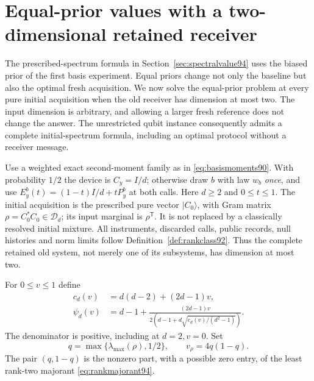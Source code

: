 \section{Equal-prior values with a two-dimensional retained receiver}
\label{sec:equalinitial95}
The prescribed-spectrum formula in Section~\ref{sec:spectralvalue94}
uses the biased prior of the first basis experiment.  Equal priors change
not only the baseline but also the optimal fresh acquisition.  We now
solve the equal-prior problem at every pure initial acquisition when the
old receiver has dimension at most two.  The input dimension is arbitrary,
and allowing a larger fresh reference does not change the answer.
The unrestricted qubit instance consequently admits a complete
initial-spectrum formula, including an optimal protocol without a
receiver message.

Use a weighted exact second-moment family as in
\eqref{eq:basismoments90}.  With probability $1/2$ the device is
$C_y=I/d$; otherwise draw $b$ with law $w_b$ \emph{once}, and use
$E_y^b(t)=(1-t)I/d+tP_y^b$ at both calls.  Here $d\ge2$ and
$0\le t\le1$.  The initial acquisition is the prescribed pure vector
$|C_0\rangle$, with Gram matrix $\rho=C_0^*C_0\in\mathcal D_d$;
its input marginal is $\rho^{\mathsf T}$.  It is not replaced by a
classically resolved initial mixture.  All instruments, discarded calls,
public records, null histories and norm limits follow
Definition~\ref{def:rankclass92}.  Thus the complete retained old system,
not merely one of its subsystems, has dimension at most two.

For $0\le v\le1$ define
\begin{equation}\label{eq:psidef95}
 \begin{split}
 c_d(v)&=d(d-2)+(2d-1)v,\\
 \psi_d(v)&=d-1+
 \frac{(2d-1)v}{2\left(d-1+
               d\sqrt{c_d(v)/(d^2-1)}\right)}.
 \end{split}
\end{equation}
The denominator is positive, including at $d=2,v=0$.
Set
\[
 q=\max\{\lambda_{\max}(\rho),1/2\},\qquad v_\rho=4q(1-q).
\]
The pair $(q,1-q)$ is the nonzero part, with a possible zero entry,
of the least rank-two majorant \eqref{eq:rankmajorant94}.

